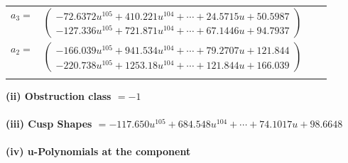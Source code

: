 \documentclass[1p]{elsarticle_modified}
\theoremstyle{definition}
\begin{document}
\begin{tabular}{m{7pt} m{180pt} m{7pt} m{180pt} }
\flushright $a_{3}=$&$\begin{pmatrix}-72.6372 u^{105}+410.221 u^{104}+\cdots+24.5715 u+50.5987\\-127.336 u^{105}+721.871 u^{104}+\cdots+67.1446 u+94.7937\end{pmatrix}$ \\
\flushright $a_{2}=$&$\begin{pmatrix}-166.039 u^{105}+941.534 u^{104}+\cdots+79.2707 u+121.844\\-220.738 u^{105}+1253.18 u^{104}+\cdots+121.844 u+166.039\end{pmatrix}$\\&\end{tabular}
\flushleft \textbf{(ii) Obstruction class $= -1$}\\~\\
\flushleft \textbf{(iii) Cusp Shapes $= -117.650 u^{105}+684.548 u^{104}+\cdots+74.1017 u+98.6648$}\\~\\
\newpage\renewcommand{\arraystretch}{1}
\flushleft \textbf{(iv) u-Polynomials at the component}\newline \\
\end{document}
